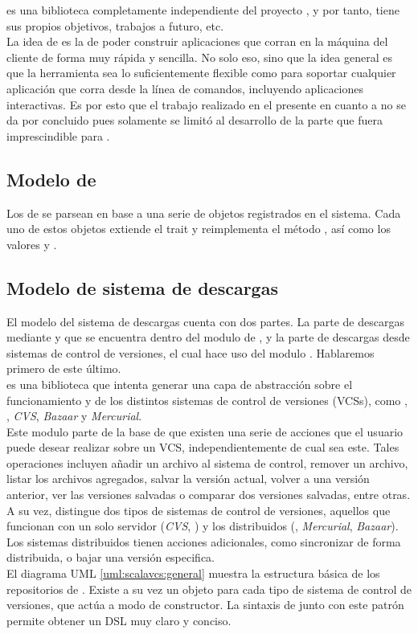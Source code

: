 \scaliapp es una biblioteca completamente independiente del proyecto \fronttier, y por tanto, tiene sus propios objetivos, trabajos a futuro, etc.\\
La idea de \scaliapp es la de poder construir aplicaciones que corran en la máquina del cliente de forma muy rápida y sencilla. No solo eso, sino que la idea general es que la herramienta sea lo suficientemente flexible como para soportar cualquier aplicación que corra desde la línea de comandos, incluyendo aplicaciones interactivas. Es por esto que el trabajo realizado en el presente en cuanto a \scaliapp no se da por concluido pues solamente se limitó al desarrollo de la parte que fuera imprescindible para \fronttier.

\subsection{Modelo de \conffiles}

Los \conffile de \fronttier se parsean en base a una serie de objetos registrados en el sistema. Cada uno de estos objetos extiende el trait  y reimplementa el método , así como los valores  y .\\


\subsection{Modelo de sistema de descargas}

El modelo del sistema de descargas cuenta con dos partes. La parte de descargas mediante \http y que se encuentra dentro del modulo de \fronttier, y la parte de descargas desde sistemas de control de versiones, el cual hace uso del modulo . Hablaremos primero de este último.\\
\scalavcs es una biblioteca que intenta generar una capa de abstracción sobre el funcionamiento y de los distintos sistemas de control de versiones (VCSs), como \git, \svn, \emph{CVS}, \emph{Bazaar} y \emph{Mercurial}.\\
Este modulo parte de la base de que existen una serie de acciones que el usuario puede desear realizar sobre un VCS, independientemente de cual sea este. Tales operaciones incluyen añadir un archivo al sistema de control, remover un archivo, listar los archivos agregados, salvar la versión actual, volver a una versión anterior, ver las versiones salvadas o comparar dos versiones salvadas, entre otras.\\
A su vez, \scalavcs distingue dos tipos de sistemas de control de versiones, aquellos que funcionan con un solo servidor (\emph{CVS}, \svn) y los distribuidos (\git, \emph{Mercurial}, \emph{Bazaar}). Los sistemas distribuidos tienen acciones adicionales, como sincronizar de forma distribuida, o bajar una versión especifica.\\
El diagrama UML \ref{uml:scalavcs:general} muestra la estructura básica de los repositorios de \scalavcs. Existe a su vez un objeto para cada tipo de sistema de control de versiones, que actúa a modo de constructor. La sintaxis de \scala junto con este patrón permite obtener un DSL muy claro y conciso.\\

